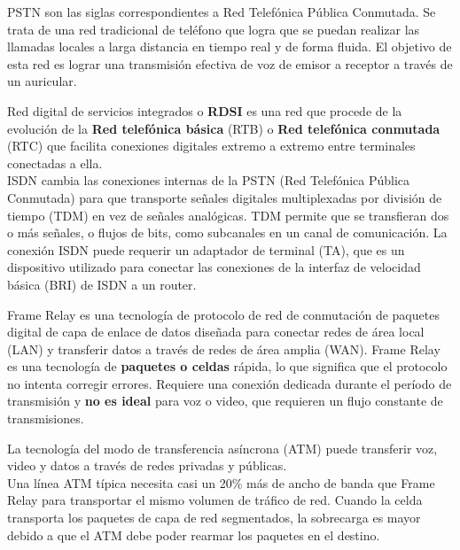 \documentclass[
	12pt, %
	fleqn, %
	a4paper, %
	oneside, %
]{LegrandOrangeBook}
\begin{document}
\begin{definition}[PSTN]
PSTN son las siglas correspondientes a Red Telefónica Pública Conmutada. Se trata de una red tradicional de teléfono que logra que se puedan realizar las llamadas locales a larga distancia en tiempo real y de forma fluida. El objetivo de esta red es lograr una transmisión efectiva de voz de emisor a receptor a través de un auricular.
\end{definition}
\begin{definition}[ISDN]
Red digital de servicios integrados o \textbf{RDSI} es una red que procede de la evolución de la \textbf{Red telefónica básica} (RTB) o  \textbf{Red telefónica conmutada} (RTC) que facilita conexiones digitales extremo a extremo entre terminales conectadas a ella.\\
ISDN cambia las conexiones internas de la  PSTN (Red Telefónica Pública Conmutada) para que transporte señales digitales  multiplexadas por división de tiempo (TDM) en  vez de señales analógicas. TDM permite que se transfieran dos o más  señales, o flujos de bits, como subcanales en  un canal de comunicación. La conexión ISDN puede requerir un adaptador  de terminal (TA), que es un dispositivo utilizado  para conectar las conexiones de la interfaz de  velocidad básica (BRI) de ISDN a un router.
\end{definition}
\begin{definition}
Frame Relay es una tecnología de protocolo de red de conmutación de paquetes digital de capa de enlace de datos diseñada para conectar redes de área local (LAN) y transferir datos a través de redes de área amplia (WAN). Frame Relay es una tecnología de \textbf{paquetes o celdas} rápida, lo que significa que el protocolo no intenta corregir errores. Requiere una conexión dedicada durante el período de transmisión y \textbf{no es ideal} para voz o video, que requieren un flujo constante de transmisiones.
\end{definition}
\begin{definition}[ATM]
La tecnología del modo de transferencia  asíncrona (ATM) puede transferir voz, video y  datos a través de redes privadas y públicas.\\
Una línea ATM típica necesita casi un 20\% más  de ancho de banda que Frame Relay para  transportar el mismo volumen de tráfico de red.
Cuando la celda transporta los paquetes de  capa de red segmentados, la sobrecarga es  mayor debido a que el ATM debe poder rearmar  los paquetes en el destino.
\end{definition}
\end{document}
